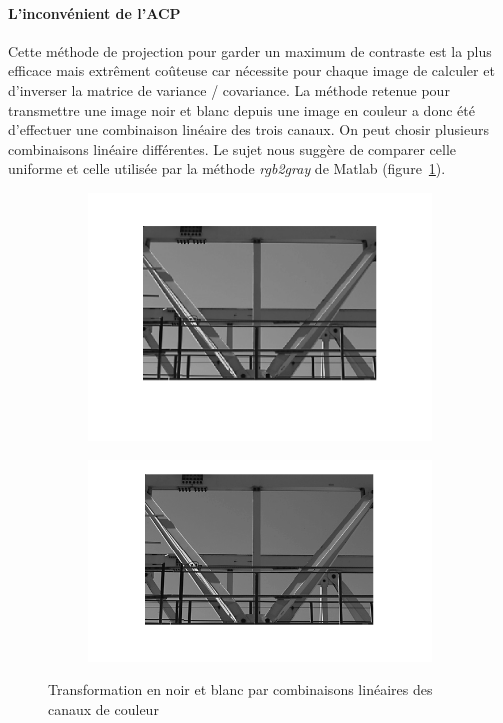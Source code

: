 \documentclass{article}
\begin{document}
\paragraph{L'inconvénient de l'ACP}
Cette méthode de projection pour garder un maximum de contraste est la plus efficace mais extrêment coûteuse car nécessite pour chaque image de calculer et d'inverser la matrice de variance / covariance. La méthode retenue pour transmettre une image noir et blanc depuis une image en couleur a donc été d'effectuer une combinaison linéaire des trois canaux. On peut chosir plusieurs combinaisons linéaire différentes. Le sujet nous suggère de comparer celle uniforme et celle utilisée par la méthode \emph{rgb2gray} de Matlab (figure~\ref{combinaisons_canaux}).
\begin{figure}[ht]
    \centering
    \begin{subfigure}[c]{0.45\linewidth}
    	\centering
    	\includegraphics[width=\linewidth]{images/1/1-3-uniform.png}
    \end{subfigure}
    \hfill
    \begin{subfigure}[c]{0.45\linewidth}
    	\centering
    	\includegraphics[width=\linewidth]{images/1/1-3-rgb2gray.png}
    \end{subfigure}
    \caption{Transformation en noir et blanc par combinaisons linéaires des canaux de couleur}
    \label{combinaisons_canaux}
\end{figure}
\end{document}
